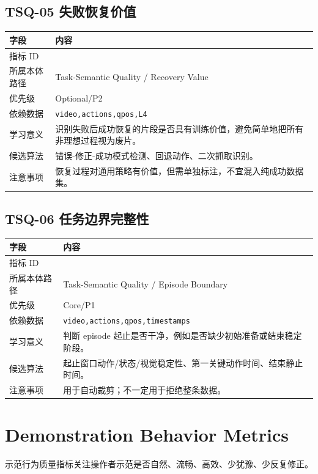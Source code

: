\documentclass[UTF8,zihao=-4]{ctexart}
\newcommand{\Code}[1]{\texttt{#1}}
\newcommand{\MID}[1]{\texttt{\seqsplit{#1}}}
\begin{document}
\subsection{TSQ-05 失败恢复价值}

\begin{longtable}{L{3.6cm} L{9.6cm}}
\toprule
字段 & 内容 \\
\midrule
指标 ID & \MID{TSQ-05} \\
所属本体路径 & Task-Semantic Quality / Recovery Value \\
优先级 & Optional/P2 \\
依赖数据 & \Code{video,actions,qpos,L4} \\
学习意义 & 识别失败后成功恢复的片段是否具有训练价值，避免简单地把所有非理想过程视为废片。 \\
候选算法 & 错误-修正-成功模式检测、回退动作、二次抓取识别。 \\
注意事项 & 恢复过程对通用策略有价值，但需单独标注，不宜混入纯成功数据集。 \\
\bottomrule
\end{longtable}

\subsection{TSQ-06 任务边界完整性}

\begin{longtable}{L{3.6cm} L{9.6cm}}
\toprule
字段 & 内容 \\
\midrule
指标 ID & \MID{TSQ-06} \\
所属本体路径 & Task-Semantic Quality / Episode Boundary \\
优先级 & Core/P1 \\
依赖数据 & \Code{video,actions,qpos,timestamps} \\
学习意义 & 判断 episode 起止是否干净，例如是否缺少初始准备或结束稳定阶段。 \\
候选算法 & 起止窗口动作/状态/视觉稳定性、第一关键动作时间、结束静止时间。 \\
注意事项 & 用于自动裁剪；不一定用于拒绝整条数据。 \\
\bottomrule
\end{longtable}

\section{Demonstration Behavior Metrics}

示范行为质量指标关注操作者示范是否自然、流畅、高效、少犹豫、少反复修正。
\end{document}
